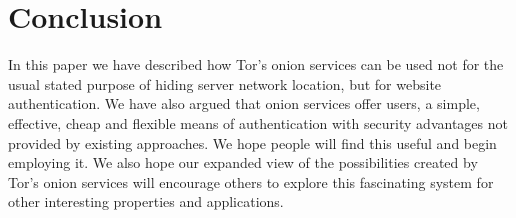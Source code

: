 \documentclass[10pt, conference, compsocconf]{styles/IEEEtran}
\newcommand{\point}[1]{\noindent\textbf{#1}.}
\begin{document}



\section{Conclusion}

In this paper we have described how Tor's onion services can be used
not for the usual stated purpose of hiding server network location,
but for website authentication.  We have also argued that onion
services offer users, a simple, effective, cheap and flexible means of
authentication with security advantages not provided by existing
approaches. We hope people will find this useful and begin employing
it. We also hope our expanded view of the possibilities created by
Tor's onion services will encourage others to explore this
fascinating system for other interesting properties and applications.




 
\newcommand{\BIBdecl}{\setlength{\itemsep}{0\baselineskip plus 0.1\baselineskip minus 0.1\baselineskip}}
\balance
{\footnotesize 


}

 
%
\end{document}
